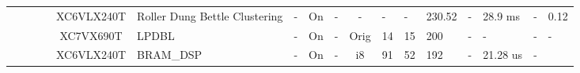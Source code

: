 \documentclass{article}
\begin{document}
\begin{table}
\begin{adjustbox}{totalheight=\baselineskip,}
\begin{tabular}{ccccclp{2em}cp{3em}cp{2em}p{4em}p{3em}p{3.5em}p{3.5em}p{2.5em}p{3em}}
\cmidrule{4-17}
   &   &   &\multirow{1}{*}{\cite{ratnakumarHighSpeedRoller2021}}
               &\multirow{1}{*}{XC6VLX240T}
                   &\multirow{1}{*}{Roller Dung Bettle Clustering}
                       &\multirow{1}{*}{-}
                           &\multirow{1}{*}{On}
                               &\multirow{1}{*}{-}
                                   &\multirow{1}{*}{-}
                                       &\multirow{1}{*}{-}
                                           &\multirow{1}{*}{-}
                                               &\multirow{1}{*}{230.52}
                                                   &\multirow{1}{*}{-}
                                                       &\multirow{1}{*}{28.9 ms}
                                                           &\multirow{1}{*}{-}
                                                               &\multirow{1}{*}{0.12}\\
\cmidrule{4-17}
   &   &   &\multirow{1}{*}{\cite{shibiOnboardTargetDetection2021a}}
               &\multirow{1}{*}{XC7VX690T}
                   &\multirow{1}{*}{LPDBL}
                       &\multirow{1}{*}{-}
                           &\multirow{1}{*}{On}
                               &\multirow{1}{*}{-}
                                   &\multirow{1}{*}{Orig}
                                       &\multirow{1}{*}{14}
                                           &\multirow{1}{*}{15}
                                               &\multirow{1}{*}{200}
                                                   &\multirow{1}{*}{-}
                                                       &\multirow{1}{*}{-}
                                                           &\multirow{1}{*}{-}
                                                               &\multirow{1}{*}{-}\\
\cmidrule{4-17}
   &   &   &\multirow{2}{*}{\cite{yahiaouiParallelizationFuzzyARTMAP2017a}}
               &\multirow{2}{*}{XC6VLX240T}
                   &\multirow{1}{*}{BRAM\_DSP}
                       &\multirow{1}{*}{-}
                           &\multirow{1}{*}{On}
                               &\multirow{1}{*}{-}
                                   &\multirow{1}{*}{i8}
                                       &\multirow{1}{*}{91}
                                           &\multirow{1}{*}{52}
                                               &\multirow{1}{*}{192}
                                                   &\multirow{1}{*}{-}
                                                       &\multirow{1}{*}{21.28 us}
                                                           &\multirow{1}{*}{-}

\end{tabular}
\end{adjustbox}
\end{table}
\end{document}
